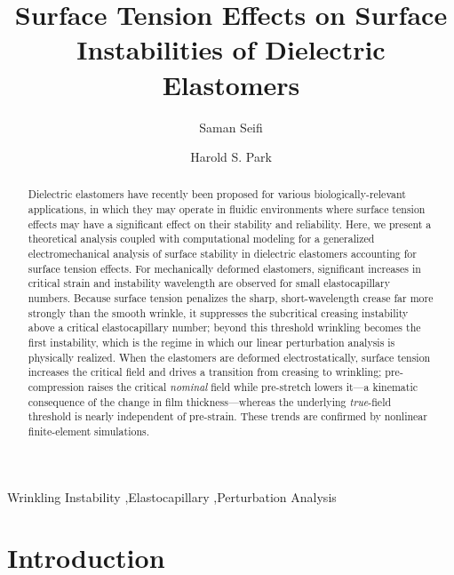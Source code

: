 \documentclass[final,3p,times]{elsarticle}
\begin{document}
\begin{frontmatter}

\title{Surface Tension Effects on Surface Instabilities of Dielectric Elastomers}

\author[ss]{Saman Seifi}
\address[ss]{Department of Mechanical Engineering, Boston University, Boston, MA 02215}
\author[hsp]{Harold S. Park}
\address[hsp]{Department of Mechanical Engineering, Boston University, Boston, MA 02215}

\begin{abstract}
Dielectric elastomers have recently been proposed for various biologically-relevant applications, in which they may operate in fluidic environments where surface tension effects may have a significant effect on their stability and reliability. Here, we present a theoretical analysis coupled with computational modeling for a generalized electromechanical analysis of surface stability in dielectric elastomers accounting for surface tension effects. For mechanically deformed elastomers, significant increases in critical strain and instability wavelength are observed for small elastocapillary numbers. Because surface tension penalizes the sharp, short-wavelength crease far more strongly than the smooth wrinkle, it suppresses the subcritical creasing instability above a critical elastocapillary number; beyond this threshold wrinkling becomes the first instability, which is the regime in which our linear perturbation analysis is physically realized. When the elastomers are deformed electrostatically, surface tension increases the critical field and drives a transition from creasing to wrinkling; pre-compression raises the critical \emph{nominal} field while pre-stretch lowers it---a kinematic consequence of the change in film thickness---whereas the underlying \emph{true}-field threshold is nearly independent of pre-strain. These trends are confirmed by nonlinear finite-element simulations.
\end{abstract}

\begin{keyword}
Wrinkling Instability \sep Elastocapillary \sep Perturbation Analysis
\end{keyword}

\end{frontmatter}

\section{Introduction}
\end{document}
